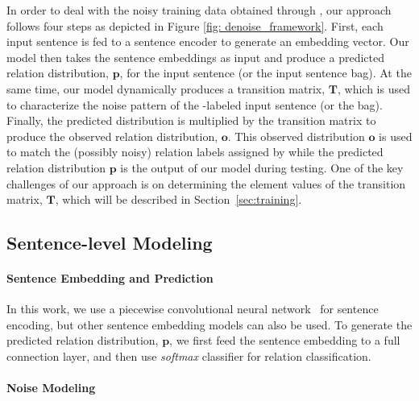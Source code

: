 In order to deal with the noisy training data obtained through \DS, our approach follows four steps as depicted in Figure \ref{fig: denoise_framework}.
First, each input sentence is fed to a sentence encoder to generate an embedding vector. Our model then takes the sentence embeddings as input and produce a predicted relation
distribution, $\mathbf{p}$, for the input sentence (or the input sentence bag). At the same time, our model dynamically produces
a transition matrix, $\mathbf{T}$, which is used to characterize the noise pattern of the \DS-labeled input sentence (or the
bag). Finally, the predicted distribution is multiplied by the transition matrix to produce the observed relation
distribution, $\mathbf{o}$. This observed distribution $\mathbf{o}$ is used to match the (possibly noisy) relation labels
assigned by \DS 
while the predicted relation distribution $\mathbf{p}$ is
the output of our model during testing.
One of the key challenges of our approach is
on determining the element values of the transition matrix, $\mathbf{T}$, which will be described in Section~\ref{sec:training}.



\subsection{Sentence-level Modeling}

\paragraph{Sentence Embedding and Prediction}
 In this work, we use a piecewise convolutional neural network~\cite{zeng2015distant} for sentence encoding, but other sentence embedding models can also be used.
To generate the predicted relation distribution, $\mathbf{p}$,  we first feed the sentence embedding to a full connection layer, and then use \emph{softmax} classifier for
relation classification.

\paragraph{Noise Modeling}

